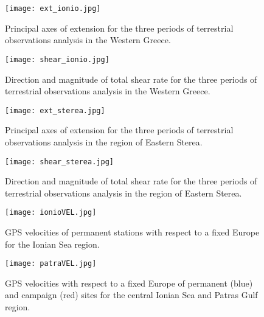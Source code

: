 \begin{extsum}
\begin{figure}[H]
  \begin{center}
    \texttt{[image: ext\_ionio.jpg]}
    \caption{Principal axes of extension for the three periods of terrestrial observations analysis in the Western Greece.}
    \label{fig_e:ext_ionio}
  \end{center}
\end{figure}

\begin{figure}[H]
  \begin{center}
    \texttt{[image: shear\_ionio.jpg]}
    \caption{Direction and magnitude of total shear rate for the three periods of terrestrial observations analysis in the Western Greece.}
    \label{fig_e:shear_ionio}
  \end{center}
\end{figure}

\begin{figure}[H]
  \begin{center}
    \texttt{[image: ext\_sterea.jpg]}
    \caption{Principal axes of extension for the three periods of terrestrial observations analysis in the region of Eastern Sterea.}
    \label{fig_e:ext_sterea}
  \end{center}
\end{figure}

\begin{figure}[H]
  \begin{center}
    \texttt{[image: shear\_sterea.jpg]}
    \caption{Direction and magnitude of total shear rate for the three periods of terrestrial observations analysis in the region of Eastern Sterea.}
    \label{fig_e:shear_sterea}
  \end{center}
\end{figure}





\begin{figure}[H]
  \begin{center}
    \texttt{[image: ionioVEL.jpg]}
    \caption{GPS velocities of permanent stations with respect to a fixed Europe for the Ionian Sea region.}
    \label{fig_e:ionioVEL}
  \end{center}
\end{figure}

\begin{figure}[H]
  \begin{center}
    \texttt{[image: patraVEL.jpg]}
    \caption{GPS velocities with respect to a fixed Europe of permanent (blue) and campaign (red) sites for the central Ionian Sea and Patras Gulf region.}
    \label{fig_e:patraVEL}
  \end{center}
\end{figure}



\end{extsum}
